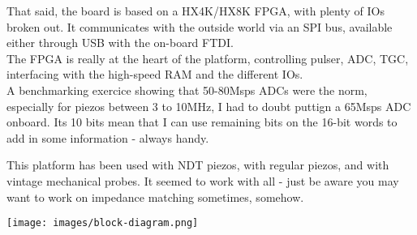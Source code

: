 \begin{minipage}{0.6\textwidth}
That said, the board is based on a HX4K/HX8K FPGA, with plenty of IOs broken out. It communicates with the outside world via an SPI bus, available either through USB with the on-board FTDI. \\

The FPGA is really at the heart of the platform, controlling pulser, ADC, TGC, interfacing with the high-speed RAM and the different IOs. \\

A benchmarking exercice showing that 50-80Msps ADCs were the norm, especially for piezos between 3 to 10MHz, I had to doubt puttign a 65Msps ADC onboard. Its 10 bits mean that I can use remaining bits on the 16-bit words to add in some information - always handy.

This platform has been used with NDT piezos, with regular piezos, and with vintage mechanical probes. It seemed to work with all - just be aware you may want to work on impedance matching sometimes, somehow.

\end{minipage}%
%
\begin{minipage}{0.4\textwidth}


        \texttt{[image: images/block-diagram.png]}





\end{minipage}